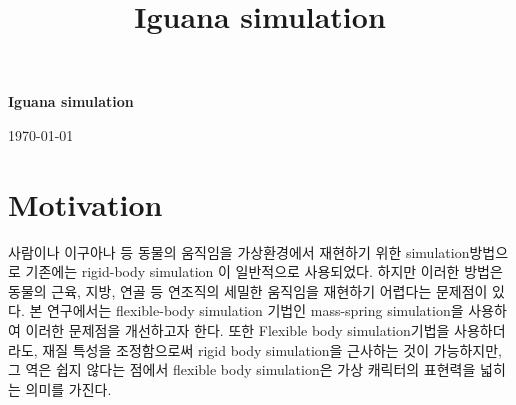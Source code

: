 \documentclass[11pt,a4paper]{article}
\title{Iguana simulation}
\begin{document}
\begin{center}
{\LARGE \textbf{Iguana simulation}}
\vspace{0.3cm}


\today
\end{center}


\section{Motivation}

사람이나 이구아나 등 동물의 움직임을 가상환경에서 재현하기 위한 simulation방법으로 기존에는 rigid-body simulation 이 일반적으로 사용되었다. 하지만 이러한 방법은 동물의 근육, 지방, 연골 등 연조직의 세밀한 움직임을 재현하기 어렵다는 문제점이 있다. 본 연구에서는 flexible-body simulation 기법인 mass-spring simulation을 사용하여 이러한 문제점을 개선하고자 한다. 또한 Flexible body simulation기법을 사용하더라도, 재질 특성을 조정함으로써 rigid body simulation을 근사하는 것이 가능하지만, 그 역은 쉽지 않다는 점에서 flexible body simulation은 가상 캐릭터의 표현력을 넓히는 의미를 가진다.
\begin{figure}[h]
\center

~
~
\caption{\label{figure1}}
\end{figure}
\end{document}

